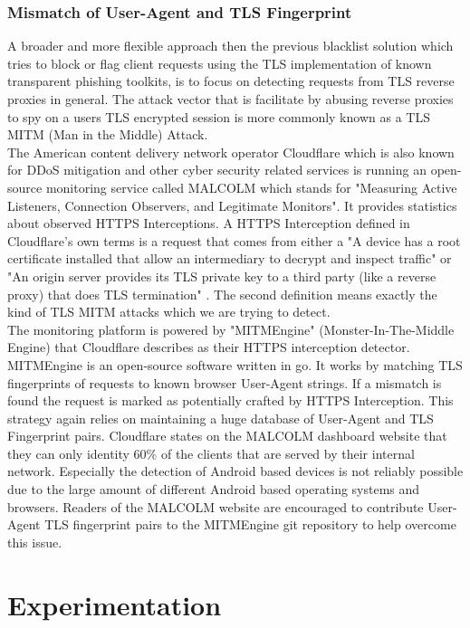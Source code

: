 \documentclass[12pt]{scrbook}
\begin{document}
\subsection{Mismatch of User-Agent and TLS Fingerprint} A broader and
more flexible approach then the previous blacklist solution which tries to
block or flag client requests using the TLS implementation of known
transparent phishing toolkits, is to focus on detecting requests from TLS
reverse proxies in general. The attack vector that is facilitate by abusing
reverse proxies to spy on a users TLS encrypted session is more commonly known
as a TLS MITM (Man in the Middle) Attack.\\The American content delivery
network operator Cloudflare which is also known for DDoS mitigation and other
cyber security related services is running an open-source monitoring service
called MALCOLM which stands for "Measuring Active Listeners, Connection
Observers, and Legitimate Monitors". It provides statistics about observed
HTTPS Interceptions. A HTTPS Interception defined in Cloudflare's own terms is
a request that comes from either a "A device has a root certificate installed
that allow an intermediary to decrypt and inspect traffic" or "An origin
server provides its TLS private key to a third party (like a reverse proxy)
that does TLS termination" \cite{cloudflareMALCOLM}. The second definition
means exactly the kind of TLS MITM attacks which we are trying to detect.\\The
monitoring platform is powered by "MITMEngine" (Monster-In-The-Middle Engine)
that Cloudflare describes as their HTTPS interception detector. MITMEngine is
an open-source software written in go. It works by matching TLS fingerprints
of requests to known browser User-Agent strings. If a mismatch is found the
request is marked as potentially crafted by HTTPS Interception. This strategy
again relies on maintaining a huge database of User-Agent and TLS Fingerprint
pairs. Cloudflare states on the MALCOLM dashboard website that they can only
identity 60\% of the clients that are served by their internal network.
Especially the detection of Android based devices is not reliably possible due
to the large amount of different Android based operating systems and browsers.
Readers of the MALCOLM website are encouraged to contribute User-Agent TLS
fingerprint pairs to the MITMEngine git repository to help overcome this
issue.


\newpage
\chapter{Experimentation}
\end{document}
